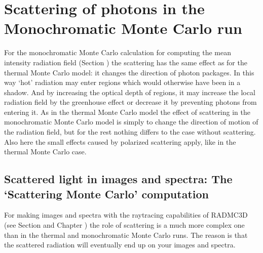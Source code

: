 \documentclass[letterpaper,10pt,english]{sphinxmanual}
\begin{document}
\section{Scattering of photons in the Monochromatic Monte Carlo run}
\label{\detokenize{dustradtrans:scattering-of-photons-in-the-monochromatic-monte-carlo-run}}\label{\detokenize{dustradtrans:sec-scat-in-mono-mc}}
For the monochromatic Monte Carlo calculation for computing the mean intensity
radiation field (Section {\hyperref[\detokenize{dustradtrans:sec-dust-monochromatic-monte-carlo}]{}}) the
scattering has the same effect as for the thermal Monte Carlo model: it changes
the direction of photon packages. In this way ‘hot’ radiation may enter regions
which would otherwise have been in a shadow. And by increasing the optical depth
of regions, it may increase the local radiation field by the greenhouse effect
or decrease it by preventing photons from entering it. As in the thermal Monte
Carlo model the effect of scattering in the monochromatic Monte Carlo model is
simply to change the direction of motion of the radiation field, but for the
rest nothing differs to the case without scattering. Also here the small effects
caused by polarized scattering apply, like in the thermal Monte Carlo case.


\subsection{Scattered light in images and spectra: The ‘Scattering Monte Carlo’ computation}
\label{\detokenize{dustradtrans:scattered-light-in-images-and-spectra-the-scattering-monte-carlo-computation}}\label{\detokenize{dustradtrans:sec-scat-monte-carlo}}
For making images and spectra with the ray\sphinxhyphen{}tracing capabilities of RADMC\sphinxhyphen{}3D (see
Section {\hyperref[\detokenize{dustradtrans:sec-dust-ray-tracing}]{}} and Chapter {\hyperref[\detokenize{imagesspectra:chap-images-spectra}]{}}) the
role of scattering is a much more complex one than in the thermal and
monochromatic Monte Carlo runs. The reason is that the scattered radiation will
eventually end up on your images and spectra.
\end{document}
